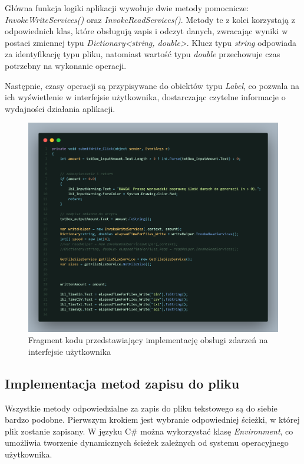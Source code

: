 \documentclass{report}
\begin{document}
Główna funkcja logiki aplikacji wywołuje dwie metody pomocnicze: \textit{InvokeWriteServices()} oraz \textit{InvokeReadServices()}. Metody te z kolei korzystają z odpowiednich klas, które obsługują zapis i odczyt danych, zwracając wyniki w postaci zmiennej typu \textit{Dictionary<string, double>}. Klucz typu \textit{string} odpowiada za identyfikację typu pliku, natomiast wartość typu \textit{double} przechowuje czas potrzebny na wykonanie operacji.

Następnie, czasy operacji są przypisywane do obiektów typu \textit{Label}, co pozwala na ich wyświetlenie w interfejsie użytkownika, dostarczając czytelne informacje o wydajności działania aplikacji.

\begin{figure}
    \centering
    \includegraphics[width=1.0\textwidth]{src/code-ui.png}
    \caption{Fragment kodu przedstawiający implementację obsługi zdarzeń na interfejsie użytkownika}
\end{figure}

\subsection{\Large Implementacja metod zapisu do pliku}

Wszystkie metody odpowiedzialne za zapis do pliku tekstowego są do siebie bardzo podobne. Pierwszym krokiem jest wybranie odpowiedniej ścieżki, w której plik zostanie zapisany. W języku C\# można wykorzystać klasę \textit{Environment}, co umożliwia tworzenie dynamicznych ścieżek zależnych od systemu operacyjnego użytkownika.
\end{document}
